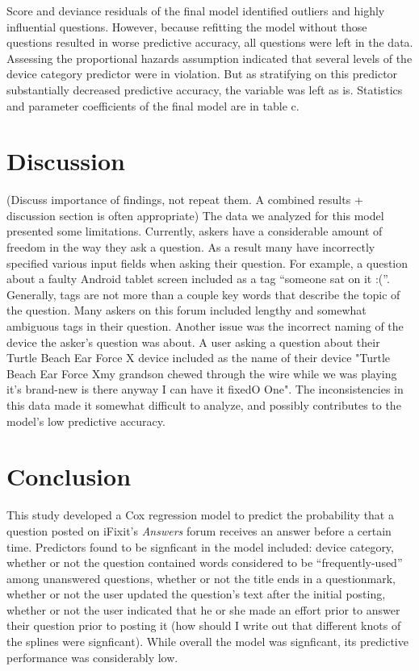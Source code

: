 \documentclass[12pt]{article}
\begin{document}
Score and deviance residuals of the final model identified outliers and highly influential questions. However, because refitting the model without those questions resulted in worse predictive accuracy, all questions were left in the data. Assessing the proportional hazards assumption indicated that several levels of the device category predictor were in violation. But as stratifying on this predictor substantially decreased predictive accuracy, the variable was left as is. Statistics and parameter coefficients of the final model are in table c. 

\section{Discussion}

(Discuss importance of findings, not repeat them. A combined results + discussion section is often appropriate) 
The data we analyzed for this model presented some limitations. Currently, askers have a considerable amount of freedom in the way they ask a question. As a result many have incorrectly specified various input fields when asking their question. For example, a question about a faulty Android tablet screen included as a tag ``someone sat on it :(''. Generally, tags are not more than a couple key words that describe the topic of the question. Many askers on this forum included lengthy and somewhat ambiguous tags in their question. Another issue was the incorrect naming of the device the asker's question was about. A user asking a question about their Turtle Beach Ear Force X device included as the name of their device "Turtle Beach Ear Force Xmy grandson chewed through the wire while we was playing it's brand-new is there anyway I can have it fixedO One". The inconsistencies in this data made it somewhat difficult to analyze, and possibly contributes to the model's low predictive accuracy. 

\section{Conclusion}

This study developed a Cox regression model to predict the probability that a question posted on iFixit's \textit{Answers} forum receives an answer before a certain time. Predictors found to be signficant in the model included: device category, whether or not the question contained words considered to be ``frequently-used'' among unanswered questions, whether or not the title ends in a questionmark, whether or not the user updated the question's text after the initial posting, whether or not the user indicated that he or she made an effort prior to answer their question prior to posting it (how should I write out that different knots of the splines were signficant). While overall the model was signficant, its predictive performance was considerably low. 
\end{document}
